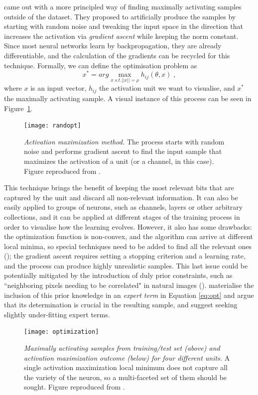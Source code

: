 \cite{Erhan2009} came out with a more principled way of finding maximally activating samples outside of the dataset. They proposed to artificially produce the samples by starting with random noise and tweaking the input space in the direction that increases the activation via \textit{gradient ascent} while keeping the norm constant. Since most neural networks learn by backpropagation, they are already differentiable, and the calculation of the gradients can be recycled for this technique. Formally, we can define the optimisation problem as
\begin{equation}
x^* = arg \max\limits_{x \; s.t. ||x||=\rho} h_{ij}(\theta,x) \; ,
\label{eq:opt}
\end{equation}
where $x$ is an input vector, $h_{ij}$ the activation unit we want to visualise, and $x^*$ the maximally activating sample. A visual instance of this process can be seen in Figure~\ref{fig:randopt}.

\begin{figure}
	\centering
	\texttt{[image: randopt]}
	\caption{\textit{Activation maximization method.} The process starts with random noise and performs gradient ascent to find the input sample that maximizes the activation of a unit (or a channel, in this case). Figure reproduced from \cite{Olah2017}.}
	\label{fig:randopt}
\end{figure}

This technique brings the benefit of keeping the most relevant bits that are captured by the unit and discard all non-relevant information. It can also be easily applied to groups of neurons, such as channels, layers or other arbitrary collections, and it can be applied at different stages of the training process in order to visualise how the learning evolves. However, it also has some drawbacks: the optimization function is non-convex, and the algorithm can arrive at different local minima, so special techniques need to be added to find all the relevant ones (\cite{Nguyen2016,Olah2017}); the gradient ascent requires setting a stopping criterion and a learning rate, and the process can produce highly unrealistic samples. This last issue could be potentially mitigated by the introduction of duly prior constraints, such as ``neighboring pixels needing to be correlated" in natural images (\cite{Mordvintsev2015}). \cite{Montavon2018} materialise the inclusion of this prior knowledge in an \textit{expert term} in Equation \ref{eq:opt} and argue that its determination is crucial in the resulting sample, and suggest seeking slightly under-fitting expert terms.    
\begin{figure}
	\centering
	\texttt{[image: optimization]}
	\caption{\textit{Maximally activating samples from training/test set (above) and activation maximization outcome (below) for four different units.} A single activation maximization local minimum does not capture all the variety of the neuron, so a multi-faceted set of them should be sought. Figure reproduced from \cite{Olah2017}.}
	\label{optimization}
\end{figure}


